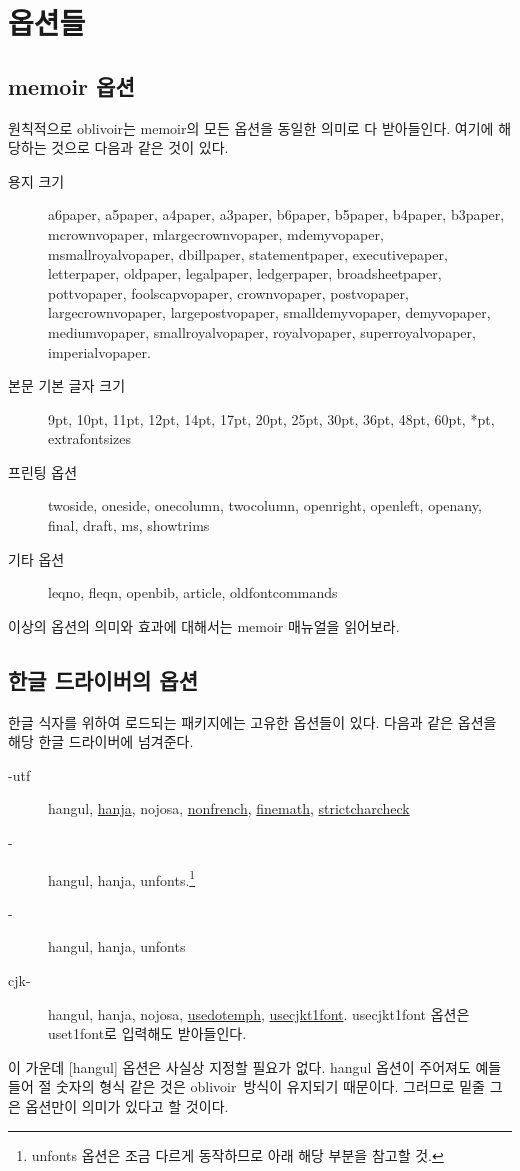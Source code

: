 \documentclass[
	12pt,
	a4paper,
	kosection,
	footnote,
	nobookmarks,
	microtype,
]{oblivoir}
\newcommand\obclass{ob\-liv\-oir\oblivoirallowbreak}
\begin{document}
\section{옵션들}

\subsection{memoir 옵션}

원칙적으로 oblivoir는 memoir의 모든 옵션을 동일한 의미로 다 받아들인다. 여기에 해당하는 것으로 
다음과 같은 것이 있다. 
\begin{description}
\item[용지 크기] a6paper, a5paper, a4paper, a3paper, b6paper, b5paper, b4paper, b3paper, mcrownvopaper, mlargecrownvopaper, mdemyvopaper, msmallroyalvopaper, dbillpaper, statementpaper, executivepaper, letterpaper, oldpaper, legalpaper, ledgerpaper, broadsheetpaper, pottvopaper, foolscapvopaper, crownvopaper, postvopaper, largecrownvopaper, largepostvopaper, smalldemyvopaper, demyvopaper, mediumvopaper, smallroyalvopaper, royalvopaper, superroyalvopaper, imperialvopaper.
\item[본문 기본 글자 크기] 9pt, 10pt, 11pt, 12pt, 14pt, 17pt, 20pt, 25pt, 30pt, 36pt, 48pt, 60pt, *pt, extrafontsizes
\item[프린팅 옵션] twoside, oneside, onecolumn, twocolumn, openright, openleft, openany, final, draft,
ms, showtrims
\item[기타 옵션] leqno, fleqn, openbib, article, oldfontcommands
\end{description}
이상의 옵션의 의미와 효과에 대해서는 memoir 매뉴얼을 읽어보라.

\subsection{한글 드라이버의 옵션}

한글 식자를 위하여 로드되는 패키지에는 고유한 옵션들이 있다.  다음과 같은 옵션을 해당
한글 드라이버에 넘겨준다.

\begin{description}
\item [\koTeX-utf] hangul, \uline{hanja}, nojosa, \uline{nonfrench}, \uline{finemath}, \uline{strictcharcheck}
\item [\XeTeX-\ko] hangul, hanja, unfonts.\footnote{unfonts 옵션은  조금 다르게 동작하므로 아래 해당 부분을 참고할 것.}
\item [\LuaTeX-\ko] hangul, hanja, unfonts
\item [cjk-\ko] hangul, hanja, nojosa, \uline{usedotemph}, \uline{usecjkt1font}. usecjkt1font 옵션은 uset1font로 입력해도 받아들인다.
\end{description}
이 가운데 [hangul] 옵션은 사실상 지정할 필요가 없다. hangul 옵션이 주어져도 예들 들어 절 숫자의 형식 같은 것은 \obclass\ 방식이 유지되기 때문이다. 그러므로 밑줄 그은 옵션만이  의미가 있다고 할 것이다.
\end{document}
